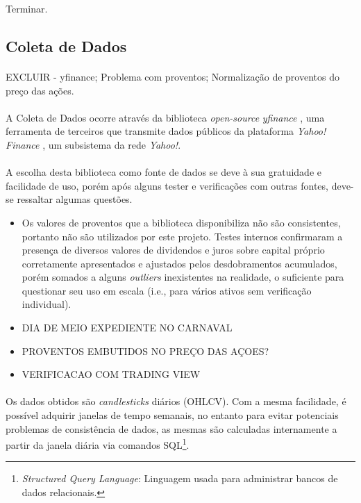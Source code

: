 Terminar.




\subsection{Coleta de Dados}

\paragraph{} EXCLUIR - yfinance; Problema com proventos; Normalização de proventos do preço das ações.

\paragraph{} A Coleta de Dados ocorre através da biblioteca \textit{open-source} \textit{yfinance} \cite{yfinance}, uma ferramenta de terceiros que transmite dados públicos da plataforma \textit{Yahoo! Finance} \cite{yahoo_finance}, um subsistema da rede \textit{Yahoo!}.

\paragraph{} A escolha desta biblioteca como fonte de dados se deve à sua gratuidade e facilidade de uso, porém após alguns tester e verificações com outras fontes, deve-se ressaltar algumas questões.

\begin{itemize}
    \item Os valores de proventos que a biblioteca disponibiliza não são consistentes, portanto não são utilizados por este projeto. Testes internos confirmaram a presença de diversos valores de dividendos e juros sobre capital próprio corretamente apresentados e ajustados pelos desdobramentos acumulados, porém somados a alguns \textit{outliers} inexistentes na realidade, o suficiente para questionar seu uso em escala (i.e., para vários ativos sem verificação individual).
    \item DIA DE MEIO EXPEDIENTE NO CARNAVAL
    \item PROVENTOS EMBUTIDOS NO PREÇO DAS AÇOES?
    \item VERIFICACAO COM TRADING VIEW
\end{itemize}

\paragraph{} Os dados obtidos são \textit{candlesticks} diários (OHLCV). Com a mesma facilidade, é possível adquirir janelas de tempo semanais, no entanto para evitar potenciais problemas de consistência de dados, as mesmas são calculadas internamente a partir da janela diária via comandos SQL\footnote{\textit{Structured Query Language}: Linguagem usada para administrar bancos de dados relacionais.}.







